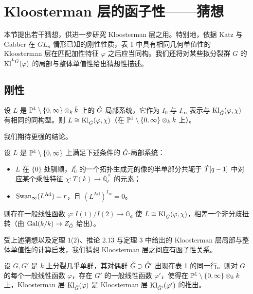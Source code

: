 
\section{Kloosterman 层的函子性——猜想}

本节提出若干猜想，供进一步研究 Kloosterman 层之用。特别地，依据 Katz 与 Gabber 在 $GL_n$ 情形已知的刚性性质，表 1 中具有相同几何单值性的 Kloosterman 层在匹配加性特征 $\varphi$ 之后应当同构。我们还将对某些拟分裂群 $G$ 的 $\mathrm{Kl}^{{}^L G}(\varphi)$ 的局部与整体单值性给出猜想性描述。

\subsection{刚性}

\begin{conjecture}
设 $L$ 是 $\mathbb{P}^1\setminus\{0,\infty\}\otimes_k\bar k$ 上的 $\check G$-局部系统，它作为 $I_0$-与 $I_\infty$-表示与 $\mathrm{Kl}_{\check G}(\varphi,\chi)$ 有相同的同构型。则 $L\cong\mathrm{Kl}_{\check G}(\varphi,\chi)$（在 $\mathbb{P}^1\setminus\{0,\infty\}\otimes_k\bar k$ 上）。
\end{conjecture}

我们期待更强的结论。

\begin{conjecture}
设 $L$ 是 $\mathbb{P}^1\setminus\{0,\infty\}$ 上满足下述条件的 $\check G$-局部系统：
\begin{itemize}[leftmargin=1.6em, itemsep=.2em]
\item $L$ 在 $\{0\}$ 处驯顺，$I^t_0$ 的一个拓扑生成元的像的半单部分共轭于 $\check T[q-1]$ 中对应某个乘性特征 $\chi:T(k)\to\overline{\mathbb{Q}}_\ell^\times$ 的元素；
\item $\mathrm{Swan}_\infty(L^{\mathrm{Ad}})=r$，且 $(L^{\mathrm{Ad}})^{I_\infty}=0$。
\end{itemize}
则存在一般线性函数 $\varphi:I(1)/I(2)\to\mathbb{G}_a$ 使 $L\cong\mathrm{Kl}_{\check G}(\varphi,\chi)$，相差一个非分歧扭转（由 $\operatorname{Gal}(\bar k/k)\to Z_{\check G}$ 给出）。
\end{conjecture}

受上述猜想以及定理 1(2)、推论 2.13 与定理 3 中给出的 Kloosterman 层局部与整体单值性的计算启发，我们猜想 Kloosterman 层之间应有函子性关系。

\begin{conjecture}
设 $G,G'$ 是 $k$ 上分裂几乎单群，其对偶群 $\check G\supset\check G'$ 出现在表 1 的同一行。则对 $G$ 的每个一般线性函数 $\varphi$，存在 $G'$ 的一般线性函数 $\varphi'$，使得在 $\mathbb{P}^1\setminus\{0,\infty\}\otimes_k\bar k$ 上，Kloosterman 层 $\mathrm{Kl}_{\check G}(\varphi)$ 是 Kloosterman 层 $\mathrm{Kl}_{\check G'}(\varphi')$ 的推出。
\end{conjecture}

